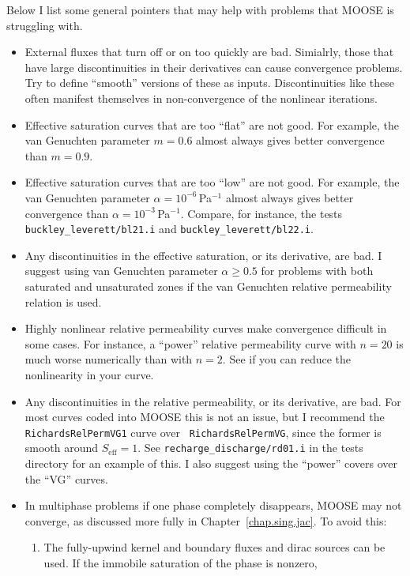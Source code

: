 \documentclass[]{scrreprt}
\begin{document}
Below I list some general pointers that may help with problems that
MOOSE is struggling with.
\begin{itemize}
\item External fluxes that turn off or on too quickly are bad.
  Simialrly, those that have large discontinuities in their
  derivatives can cause convergence problems.  Try to define
  ``smooth'' versions of these as inputs.  Discontinuities like these
  often manifest themselves in non-convergence of the nonlinear
  iterations.
\item Effective saturation curves that are too ``flat'' are not good.
  For example, the van Genuchten parameter $m=0.6$ almost always gives
  better convergence than $m=0.9$.
\item Effective saturation curves that are too ``low'' are not good.
  For example, the van Genuchten parameter $\alpha=10^{-6}$\,Pa$^{-1}$
  almost always gives better convergence than
  $\alpha=10^{-3}$\,Pa$^{-1}$.  Compare, for instance, the tests {\tt
    buckley\_leverett/bl21.i} and {\tt buckley\_leverett/bl22.i}.
\item Any discontinuities in the effective saturation, or its
  derivative, are bad.  I suggest using van Genuchten parameter
  $\alpha\geq 0.5$ for problems with both saturated and unsaturated
  zones if the van Genuchten relative permeability relation is used.
\item Highly nonlinear relative permeability curves make convergence
  difficult in some cases.  For instance, a ``power'' relative
  permeability curve with $n=20$ is much worse numerically than with
  $n=2$.  See if you can reduce the nonlinearity in your curve.
\item Any discontinuities in the relative permeability, or its derivative,
  are bad.  For most curves coded into MOOSE this is not an issue, but
  I recommend the {\tt RichardsRelPermVG1} curve over {\tt
    RichardsRelPermVG}, since the former is smooth around
  $S_{\mathrm{eff}}=1$.  See {\tt recharge\_discharge/rd01.i} in the
  tests directory for an example of this.   I also suggest using the
  ``power'' covers over the ``VG'' curves.
\item In multiphase problems if one phase completely disappears, MOOSE
  may not converge, as discussed more fully in
  Chapter~\ref{chap.sing.jac}.  To avoid this: 
\begin{enumerate}
\item The fully-upwind kernel and boundary fluxes and dirac sources
  can be used.  If the immobile saturation of the phase is nonzero,

\end{enumerate}
\end{itemize}
\end{document}
